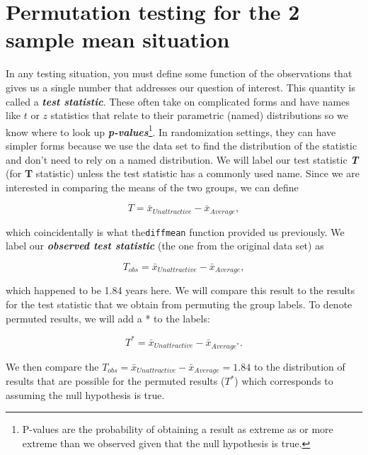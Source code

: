 \documentclass[]{book}
\let\rmarkdownfootnote\footnote%
\def\footnote{\protect\rmarkdownfootnote}
\begin{document}
\section{Permutation testing for the 2 sample mean
situation}\label{section2-4}

In any testing situation, you must define some function of the
observations that gives us a single number that addresses our question
of interest. This quantity is called a \textbf{\emph{test statistic}}.
These often take on complicated forms and have names like \(t\) or \(z\)
statistics that relate to their parametric (named) distributions so we
know where to look up \textbf{\emph{p-values}}\footnote{P-values are the
  probability of obtaining a result as extreme as or more extreme than
  we observed given that the null hypothesis is true.}. In randomization
settings, they can have simpler forms because we use the data set to
find the distribution of the statistic and don't need to rely on a named
distribution. We will label our test statistic \textbf{\emph{T}} (for
\textbf{T} statistic) unless the test statistic has a commonly used
name. Since we are interested in comparing the means of the two groups,
we can define

\[T=\bar{x}_{Unattractive}-\bar{x}_{Average},\]

which coincidentally is what the\texttt{diffmean} function provided us
previously. We label our \textbf{\emph{observed test statistic}} (the
one from the original data set) as

\[T_{obs}=\bar{x}_{Unattractive}-\bar{x}_{Average},\]

which happened to be 1.84 years here. We will compare this result to the
results for the test statistic that we obtain from permuting the group
labels. To denote permuted results, we will add a * to the labels:

\[T^*=\bar{x}_{Unattractive}-\bar{x}_{Average^*}.\]

We then compare the
\(T_{obs}=\bar{x}_{Unattractive}-\bar{x}_{Average} = 1.84\) to the
distribution of results that are possible for the permuted results
(\(T^*\)) which corresponds to assuming the null hypothesis is true.
\end{document}
